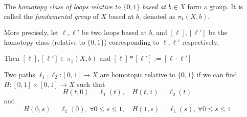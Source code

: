 \begin{definition}
The \emph{homotopy class of loops relative to $\{0,1\}$ based at $b\in X$} form a group.
It is called the \emph{fundamental group} of $X$ based at $b$, denoted as $\pi_1(X,b)$.

More precisely, 
let $\ell,\ell'$ be two loops based at $b$, and $[\ell],[\ell']$ be the homotopy class (relative to $\{0,1\}$) corresponding to $\ell,\ell'$ respectively.

Then $[\ell],[\ell']\in\pi_1(X,b)$ and $[\ell]*[\ell']:=[\ell\cdot\ell']$
\end{definition}

\begin{remark}
Two paths $\ell_1,\ell_2:[0,1]\to X$ are homotopic relative to $\{0,1\}$ if we can find $H:[0,1]\times[0,1]\to X$ such that
\[
H(t,0)=\ell_1(t),\quad
H(t,1)=\ell_2(t)
\]
and
\[
H(0,s) = \ell_1(0),\ \forall 0\le s\le1,\quad
H(1,s) = \ell_1(s),\ \forall 0\le s\le 1
\]
\end{remark}














